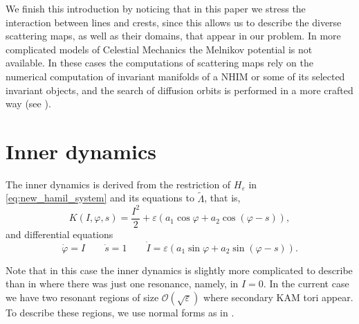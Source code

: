 \documentclass[a4paper,10pt]{article}
\newcommand{\NH}{\text{NHIM}}
\theoremstyle{definition}
\begin{document}
We finish this introduction by noticing that in this paper we stress the interaction between {\NH} lines and crests,
since this allows us to describe the diverse scattering maps, as well as their domains, that appear in our problem.
In more complicated models of Celestial Mechanics the Melnikov potential is not available.
In these cases the computations of scattering maps rely on the numerical computation of invariant manifolds of a NHIM
or some of its selected invariant objects, and the search of diffusion orbits is performed in a more crafted way (see \cite{Canalias2006,delshams2008b,delshams2013,capinski2017,delshams201629}).
\section{Inner dynamics}
\label{sec:inner}

The inner dynamics is derived from the restriction of $H_{\varepsilon}$ in \eqref{eq:new_hamil_system} and its equations to $\tilde{\Lambda}$, that is,
\begin{equation}
K(I,\varphi,s) = \frac{I^{2}}{2} + \varepsilon\left(a_{1}\cos\varphi + a_{2}\cos(\varphi -s)\right), \label{eq:hamiltonian_inner}
\end{equation}
and differential equations
\begin{equation}
\dot{\varphi} = I \quad\quad \dot{s} = 1\quad\quad\dot{I} =\varepsilon\left(a_{1}\sin\varphi + a_{2}\sin(\varphi-s)\right).\label{eq:equations_inner}
\end{equation}

Note that in this case the inner dynamics is slightly more complicated to describe than in \cite{Delshams2017} where there was just one resonance, namely, in $I=0$.
In the current case we have two resonant regions of size $\mathcal{O}(\sqrt{\varepsilon})$ where secondary KAM tori appear.
To describe these regions, we use normal forms as in \cite{Seara2006}.
\end{document}
